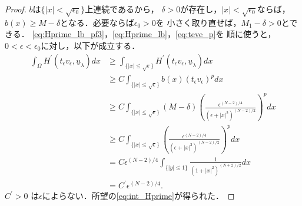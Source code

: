 \begin{proof}
 $b$は$\{ \lvert x \rvert < \sqrt{\epsilon_0}\}$上連続であるから，
 $\delta > 0$が存在し，$\lvert x \rvert < \sqrt{\epsilon_0}$ならば，
 $b(x) \geq M - \delta$となる．必要ならば$\epsilon_0 > 0$を
 小さく取り直せば，$M_1 - \delta > 0$とできる．
 \eqref{eq:Hprime_lb_pf3}，\eqref{eq:Hprime_lb}，\eqref{eq:teve_p}を
 順に使うと，
 $0 < \epsilon < \epsilon_0$に対し，以下が成立する．
 \begin{align*}
  \int_\Omega H^\prime(t_\epsilon v_\epsilon, \underline{u}_\lambda )
  dx & \geq \int_{\{ \lvert x \rvert \leq \sqrt{\epsilon} \}} 
  H^\prime(t_\epsilon v_\epsilon, \underline{u}_\lambda ) dx \\
  & \geq C \int_{\{ \lvert x \rvert \leq \sqrt{\epsilon} \}} 
  b(x) (t_\epsilon v_\epsilon)^p dx \\
  & \geq C \int_{\{ \lvert x \rvert \leq \sqrt{\epsilon} \}} 
  (M - \delta) \left(
  \frac{\epsilon^{(N-2)/4}}{(\epsilon + \lvert x \rvert^2)^{(N-2)/2}}
  \right)^p dx \\
  & \geq C \int_{\{ \lvert x \rvert \leq \sqrt{\epsilon} \}} 
  \left(
  \frac{\epsilon^{(N-2)/4}}{(\epsilon + \lvert x \rvert^2)^{(N-2)/2}}
  \right)^p dx \\
  & = C \epsilon^{(N-2)/4} \int_{ \{ \lvert y \rvert \leq 1 \}}
  \frac{1}{(1 + \lvert x \rvert^2)^{(N+2)/2}} dx \\
  & = C^\prime \epsilon^{(N-2)/4}.
 \end{align*}
 $C^\prime > 0$
 は$\epsilon$によらない．所望の\eqref{eq:int_Hprime}が得られた．\qedhere
\end{proof}


